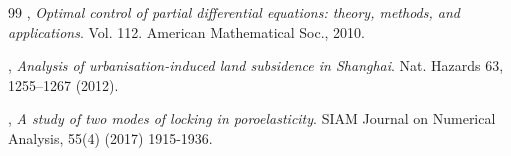 \documentclass[smallextended]{svjour3}
\numberwithin{equation}{section}
\numberwithin{figure}{section}
\numberwithin{table}{section}
\begin{document}
\begin{thebibliography}{99}
		, {\it Optimal control of partial differential equations: theory, methods, and applications}. Vol. 112. American Mathematical Soc., 2010.

        , {\it Analysis of urbanisation-induced land subsidence in Shanghai}. Nat. Hazards 63, 1255--1267 (2012).

        , {\it A study of two modes of locking in poroelasticity}. SIAM Journal on Numerical Analysis, 55(4) (2017) 1915-1936.
				
			\end{thebibliography}
			
		
\end{document}
